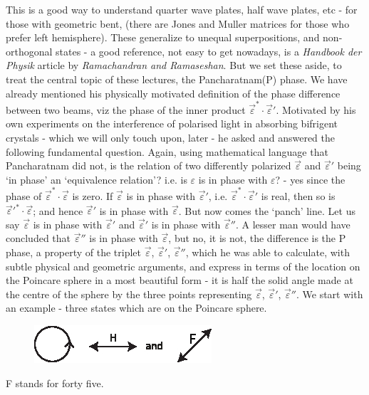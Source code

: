 This is a good way to understand quarter wave plates, half wave plates,
etc - for those with geometric bent, (there are Jones and Muller matrices for
those who prefer left hemisphere). These generalize to unequal superpositions,
and non-orthogonal states - a good reference, not easy to get nowadays, is a
\textit{Handbook der Physik} article by \textit{Ramachandran and Ramaseshan}. But we set
these aside, to treat the central topic of these lectures, the Pancharatnam(P)
phase. We have already mentioned his physically motivated definition of the
phase difference between two beams, viz the phase of the inner product $\overrightarrow{\varepsilon}^{\ast} \cdot \overrightarrow{\varepsilon}'$. 
Motivated by his own experiments on the interference of polarised light in absorbing bifrigent crystals - which we will only touch upon, later - he asked and
answered the following fundamental question. Again, using mathematical language that Pancharatnam did not, is the relation of two differently polarized
$\overrightarrow{\varepsilon}$ and $\overrightarrow{\varepsilon}'$ being `in phase' an `equivalence relation'? i.e. is $\varepsilon$ is in phase
with $\varepsilon$? - yes since the phase of $\overrightarrow{\varepsilon}^{\ast} \cdot \overrightarrow{\varepsilon}$ is zero. If $\overrightarrow{\varepsilon}$ is in phase with $\overrightarrow{\varepsilon}'$, i.e. $\overrightarrow{\varepsilon}^{\ast} \cdot \overrightarrow{\varepsilon}'$ is real, then so is $\overrightarrow{\varepsilon}'^{\ast} \cdot \overrightarrow{\varepsilon}$; and hence $\overrightarrow{\varepsilon}'$ is in phase with $\overrightarrow{\varepsilon}$. But now comes the `panch' line. Let us say $\overrightarrow{\varepsilon}$ is in phase with $\overrightarrow{\varepsilon}'$ and $\overrightarrow{\varepsilon}'$ is in phase with $\overrightarrow{\varepsilon}''$. A lesser man would have concluded that $\overrightarrow{\varepsilon}''$ is in phase with $\overrightarrow{\varepsilon}$, but no, it is not, the difference is the P phase, a property of the triplet $\overrightarrow{\varepsilon}$, $\overrightarrow{\varepsilon}'$, $\overrightarrow{\varepsilon}''$, which he 
was able to calculate, with subtle physical and geometric arguments, and express in
terms of the location on the Poincare sphere in a most beautiful form - it is half
the solid angle made at the centre of the sphere by the three points representing
$\overrightarrow{\varepsilon}$, $\overrightarrow{\varepsilon}'$, $\overrightarrow{\varepsilon}''$. We start with an example - three states which are on the Poincare sphere.
\begin{figure}[H]
\centering
\includegraphics[scale=0.8]{src/images/chap26/10.jpg}
\end{figure}
F stands for forty five.

